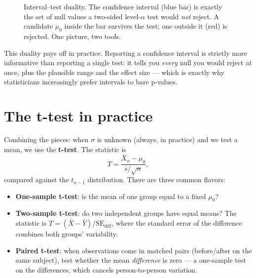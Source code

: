 \begin{figure}[H]
\centering
{}
\caption{Interval--test duality. The confidence interval (blue bar) is exactly the set
of null values a two-sided level-$\alpha$ test would \emph{not} reject. A candidate
$\mu_0$ inside the bar survives the test; one outside it (red) is rejected. One picture,
two tools.}
\label{ch32:fig-duality}
\end{figure}

This duality pays off in practice. Reporting a confidence interval is strictly more
informative than reporting a single test: it tells you \emph{every} null you would
reject at once, plus the plausible range and the effect size --- which is exactly why
statisticians increasingly prefer intervals to bare p-values.

\section{The t-test in practice}
\label{ch32:ttest}

Combining the pieces: when $\sigma$ is unknown (always, in practice) and we test a mean,
we use the \textbf{t-test}. The statistic is
\[
  T = \frac{\bar X_n - \mu_0}{s/\sqrt n},
\]
compared against the $t_{n-1}$ distribution. There are three common flavors:

\begin{itemize}
  \item \textbf{One-sample t-test}: is the mean of one group equal to a fixed $\mu_0$?
  \item \textbf{Two-sample t-test}: do two independent groups have equal means? The
  statistic is $T = (\bar X - \bar Y)/\mathrm{SE}_{\text{diff}}$, where the standard
  error of the difference combines both groups' variability.
  \item \textbf{Paired t-test}: when observations come in matched pairs (before/after on
  the same subject), test whether the mean \emph{difference} is zero --- a one-sample
  test on the differences, which cancels person-to-person variation.
\end{itemize}

